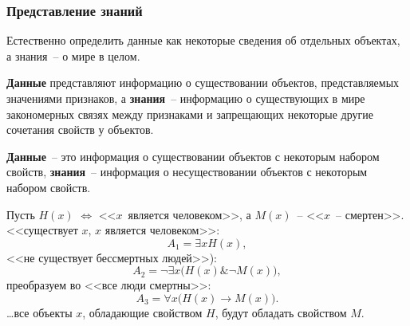 \documentclass[10pt]{beamer}
\begin{document}


\begin{frame}[fragile]
  \frametitle{Представление знаний}
\small
Естественно определить данные как некоторые сведения об отдельных объектах, а знания~-- о мире в целом.

{\bf Данные} представляют информацию о существовании объектов, представляемых значениями признаков, а {\bf знания}~-- информацию о существующих в мире закономерных связях между признаками и запрещающих некоторые другие сочетания свойств у объектов.

{\bf Данные}~-- это информация о существовании объектов с некоторым набором свойств, {\bf знания}~-- информация о несуществовании объектов с некоторым набором свойств.

Пусть $H(x)$ $\Leftrightarrow$ <<$x$~является человеком>>, а $M(x)$~-- <<$x$~-- смертен>>. \\

\noindent{}<<существует $x$, $x$ является человеком>>:
$$
    A_1=\exists x H(x),
$$
<<не существует бессмертных людей>>):
$$
    A_2=\neg\exists x \big ( H(x) \& \neg M(x) \big ),
$$
преобразуем во <<все люди смертны>>:
$$
    A_3=\forall x \big ( H(x)\to M(x)\big ).
$$
\ldots все объекты $x$, обладающие свойством $H$, будут обладать свойством $M$.

\end{frame}
\end{document}
